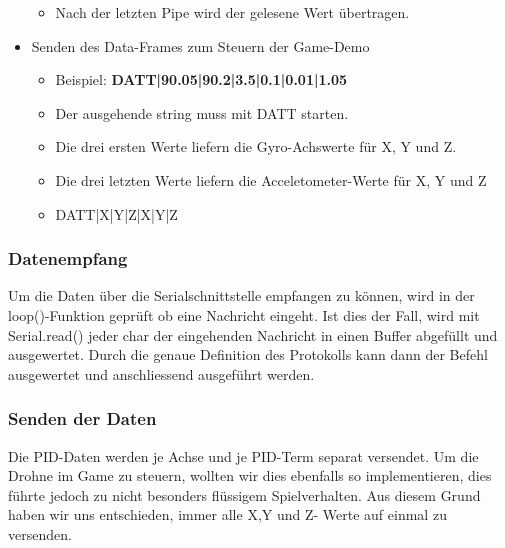 \begin{itemize}
\begin{itemize}
    \item Nach der letzten Pipe wird der gelesene Wert übertragen.
  \end{itemize}
  \item Senden des Data-Frames zum Steuern der Game-Demo
  \begin{itemize}
    \item Beispiel: \textbf{DATT|90.05|90.2|3.5|0.1|0.01|1.05}
    \item Der ausgehende string muss mit DATT starten.
    \item Die drei ersten Werte liefern die Gyro-Achswerte für X, Y und Z.
    \item Die drei letzten Werte liefern die Acceletometer-Werte für X, Y und Z
    \item DATT|X|Y|Z|X|Y|Z
  \end{itemize}
\end{itemize} 

\subsubsection{Datenempfang}
Um die Daten über die Serialschnittstelle empfangen zu können, wird in der loop()-Funktion geprüft ob eine Nachricht eingeht. Ist dies der Fall, wird mit Serial.read() jeder char der eingehenden Nachricht in einen Buffer abgefüllt und ausgewertet. Durch die genaue Definition des Protokolls kann dann der Befehl ausgewertet und anschliessend ausgeführt werden.

\subsubsection{Senden der Daten}
Die PID-Daten werden je Achse und je PID-Term separat versendet. Um die Drohne im Game zu steuern, wollten wir dies ebenfalls so implementieren, dies führte jedoch zu nicht besonders flüssigem Spielverhalten. Aus diesem Grund haben wir uns entschieden, immer alle X,Y und Z- Werte auf einmal zu versenden.